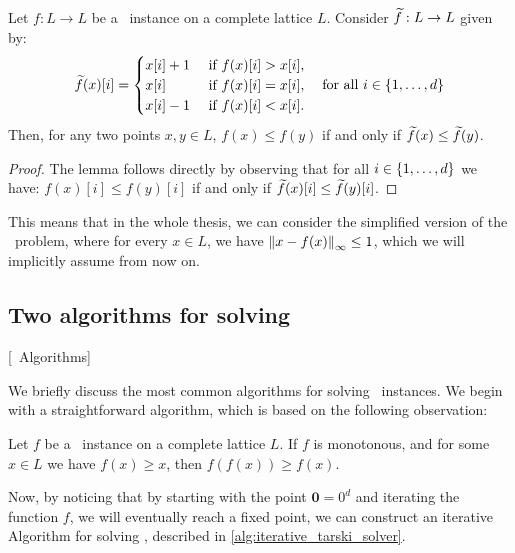 \begin{lemma}
    Let $f : L \rightarrow L$ be a \Tarski\ instance on a complete lattice $L$. Consider $\widetilde{f} : L \rightarrow L$ given by: 
    \begin{align*}
        \widetilde{f}(x)[i] = \begin{cases}
                            x[i] + 1 & \text{ if } f(x)[i] > x[i], \\
                            x[i]     & \text{ if } f(x)[i] = x[i], \\
                            x[i] - 1 & \text{ if } f(x)[i] < x[i].
                        \end{cases} \quad \text{for all $i \in \left\{1, \dots, d\right\}$}
    \end{align*}
    Then, for any two points $x, y \in L$, $f(x) \leq f(y)$ if and only if $\widetilde{f}(x) \leq \widetilde{f}(y)$.
\end{lemma}
\begin{proof}
    The lemma follows directly by observing that for all $i \in \left\{1, \dots, d\right\}$ we have: $f(x)[i] \leq f(y)[i]$ if and only if $\widetilde{f}(x)[i] \leq \widetilde{f}(y)[i]$.
\end{proof}
This means that in the whole thesis, we can consider the simplified version of the \Tarski\ problem, where for every $x \in L$, we have $\left\lVert x - f(x)\right\rVert_{\infty} \leq 1$, which we will implicitly assume from now on.

\subsection{Two algorithms for solving \Tarski}[\Tarski\ Algorithms]
\label{sec:tarski_algorithms}

We briefly discuss the most common algorithms for solving \Tarski\ instances. We begin with a straightforward algorithm, which is based on the following observation:
\begin{remark}
    Let $f$ be a \Tarski\ instance on a complete lattice $L$. If $f$ is monotonous, and for some $x \in L$ we have $f(x) \geq x$, then $f(f(x)) \geq f(x)$.
\end{remark}
Now, by noticing that by starting with the point $\mathbf{0} = 0^d$ and iterating the function $f$, we will eventually reach a fixed point, we can construct an iterative Algorithm for solving \Tarski, described in \cref{alg:iterative_tarski_solver}.

